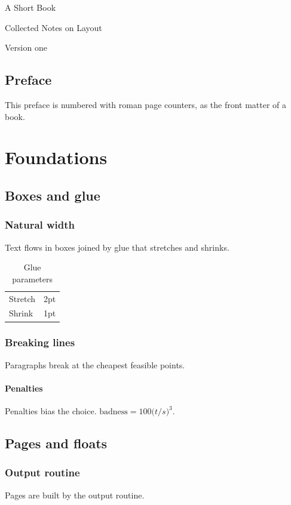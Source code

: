 \documentclass[10pt,twoside,openright]{book}
\begin{document}
\frontmatter
\begin{titlepage}
  \centering\vspace*{3cm}
  {\sffamily\LARGE A Short Book\par}\vspace{1cm}
  {\large Collected Notes on Layout\par}\vfill
  {\small Version one}
\end{titlepage}
\chapter*{Preface}
This preface is numbered with roman page counters, as the front matter of a book.
\tableofcontents
\listoftables

\mainmatter
\part{Foundations}
\chapter{Boxes and glue}
\section{Natural width}
Text flows in boxes joined by glue that stretches and shrinks.
\begin{table}[h]\centering\caption{Glue parameters}\begin{tabular}{lr}Stretch & 2pt\\ Shrink & 1pt\end{tabular}\end{table}
\section{Breaking lines}
Paragraphs break at the cheapest feasible points.
\subsection{Penalties}
Penalties bias the choice. $\mathrm{badness}=100\bigl(t/s\bigr)^{3}$.
\chapter{Pages and floats}
\section{Output routine}
Pages are built by the output routine.
\end{document}

